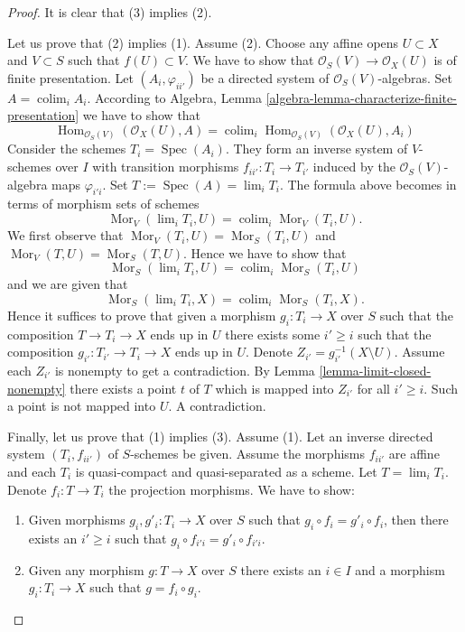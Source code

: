 \documentclass[10pt,a4paper]{amsart}
\theoremstyle{plain}
\theoremstyle{definition}
\theoremstyle{remark}
\numberwithin{equation}{subsection}
\def\lim{\mathop{\mathrm{lim}}\nolimits}
\def\colim{\mathop{\mathrm{colim}}\nolimits}
\def\Spec{\mathop{\mathrm{Spec}}}
\def\Hom{\mathop{\mathrm{Hom}}\nolimits}
\def\Mor{\mathop{\mathrm{Mor}}\nolimits}
\begin{document}
\begin{proof}
It is clear that (3) implies (2).

\medskip\noindent
Let us prove that (2) implies (1). Assume (2).
Choose any affine opens $U \subset X$ and $V \subset S$ such that
$f(U) \subset V$. We have to show that
$\mathcal{O}_S(V) \to \mathcal{O}_X(U)$ is of finite presentation.
Let $(A_i, \varphi_{ii'})$ be a directed system of
$\mathcal{O}_S(V)$-algebras. Set $A = \colim_i A_i$.
According to
Algebra, Lemma \ref{algebra-lemma-characterize-finite-presentation}
we have to show that
$$
\Hom_{\mathcal{O}_S(V)}(\mathcal{O}_X(U), A) =
\colim_i \Hom_{\mathcal{O}_S(V)}(\mathcal{O}_X(U), A_i)
$$
Consider the schemes $T_i = \Spec(A_i)$. They
form an inverse system of $V$-schemes over $I$
with transition morphisms $f_{ii'} : T_i \to T_{i'}$
induced by the $\mathcal{O}_S(V)$-algebra maps $\varphi_{i'i}$.
Set $T := \Spec(A) = \lim_i T_i$.
The formula above becomes in terms of morphism sets of schemes
$$
\Mor_V(\lim_i T_i, U) =
\colim_i \Mor_V(T_i, U).
$$
We first observe that
$\Mor_V(T_i, U) = \Mor_S(T_i, U)$
and
$\Mor_V(T, U) = \Mor_S(T, U)$.
Hence we have to show that
$$
\Mor_S(\lim_i T_i, U) =
\colim_i \Mor_S(T_i, U)
$$
and we are given that
$$
\Mor_S(\lim_i T_i, X) =
\colim_i \Mor_S(T_i, X).
$$
Hence it suffices to prove that given a morphism $g_i : T_i \to X$ over $S$
such that the composition $T \to T_i \to X$ ends up in $U$ there exists some
$i' \geq i$ such that the composition $g_{i'} : T_{i'} \to T_i \to X$ ends up
in $U$. Denote $Z_{i'} = g_{i'}^{-1}(X \setminus U)$.
Assume each $Z_{i'}$ is nonempty
to get a contradiction. By Lemma \ref{lemma-limit-closed-nonempty}
there exists a point $t$ of $T$ which is mapped into $Z_{i'}$ for all
$i' \geq i$. Such a point is not mapped into $U$. A contradiction.

\medskip\noindent
Finally, let us prove that (1) implies (3). Assume (1). Let an inverse directed
system $(T_i, f_{ii'})$ of $S$-schemes be given. Assume the morphisms $f_{ii'}$
are affine and each $T_i$ is quasi-compact and quasi-separated as a scheme. Let
$T = \lim_i T_i$. Denote $f_i : T \to T_i$ the projection morphisms.
We have to show:
\begin{enumerate}
\item[(a)] Given morphisms $g_i, g'_i : T_i \to X$ over $S$ such that
$g_i \circ f_i = g'_i \circ f_i$, then there exists an $i' \geq i$
such that $g_i \circ f_{i'i} = g'_i \circ f_{i'i}$.
\item[(b)] Given any morphism
$g : T \to X$ over $S$ there exists an $i \in I$ and a morphism
$g_i : T_i \to X$ such that $g = f_i \circ g_i$.
\end{enumerate}


\end{proof}
\end{document}
